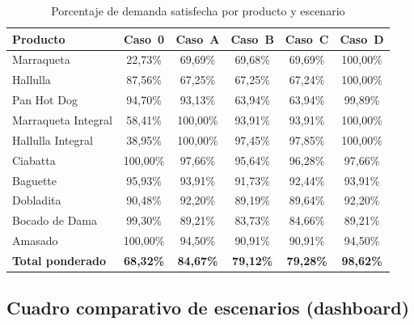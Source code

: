 \documentclass[12pt]{article}
\begin{document}
\begin{table}[H]
\centering
\caption{Porcentaje de demanda satisfecha por producto y escenario}
\label{tab:resultados-nds-acad}
\renewcommand{\arraystretch}{1.3}
\begin{tabularx}{\textwidth}{Xccccc}
\toprule
\rowcolor{tabhead}
\color{white}\textbf{Producto} &
\color{white}\textbf{Caso~0} &
\color{white}\textbf{Caso~A} &
\color{white}\textbf{Caso~B} &
\color{white}\textbf{Caso~C} &
\color{white}\textbf{Caso~D} \\
\midrule
\rowcolor{tabrow} Marraqueta           & 22,73\% & 69,69\% & 69,68\% & 69,69\% & 100,00\% \\
Hallulla                               & 87,56\% & 67,25\% & 67,25\% & 67,24\% & 100,00\% \\
\rowcolor{tabrow} Pan Hot Dog          & 94,70\% & 93,13\% & 63,94\% & 63,94\% & 99,89\% \\
Marraqueta Integral                    & 58,41\% & 100,00\% & 93,91\% & 93,91\% & 100,00\% \\
\rowcolor{tabrow} Hallulla Integral    & 38,95\% & 100,00\% & 97,45\% & 97,85\% & 100,00\% \\
Ciabatta                               & 100,00\% & 97,66\% & 95,64\% & 96,28\% & 97,66\% \\
\rowcolor{tabrow} Baguette             & 95,93\% & 93,91\% & 91,73\% & 92,44\% & 93,91\% \\
Dobladita                              & 90,48\% & 92,20\% & 89,19\% & 89,64\% & 92,20\% \\
\rowcolor{tabrow} Bocado de Dama       & 99,30\% & 89,21\% & 83,73\% & 84,66\% & 89,21\% \\
Amasado                                & 100,00\% & 94,50\% & 90,91\% & 90,91\% & 94,50\% \\
\midrule
\rowcolor{tabrow}\textbf{Total ponderado} & \textbf{68,32\%} & \textbf{84,67\%} & \textbf{79,12\%} & \textbf{79,28\%} & \textbf{98,62\%} \\
\bottomrule
\end{tabularx}
\end{table}

\subsection{Cuadro comparativo de escenarios (dashboard)}
\end{document}
